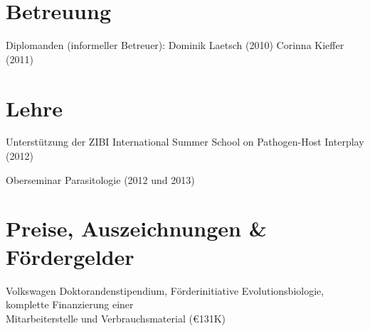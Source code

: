 \documentclass[10pt,a4paper]{article}
\renewenvironment{itemize}{
  \begin{list}{}{
    \setlength{\leftmargin}{2.5em}
    \setlength{\itemsep}{0.25em}
    \setlength{\parskip}{0pt}
    \setlength{\parsep}{0.25em}
  }
}{
  \end{list}
}
\begin{document}
\section*{Betreuung}
\begin{itemize}
\item Diplomanden (informeller Betreuer):\newline
  Dominik Laetsch (2010)\newline
  Corinna Kieffer (2011)
\end{itemize}

\section*{Lehre}
\begin{itemize}
\item Unterst\"utzung der ZIBI International Summer School on Pathogen-Host
  Interplay (2012)
\item Oberseminar Parasitologie (2012 und 2013)
\end{itemize}

\section*{Preise, Auszeichnungen \& F\"ordergelder}

\begin{itemize}
\item [2008] Volkswagen Doktorandenstipendium, F\"orderinitiative
  Evolutionsbiologie, komplette Finanzierung einer \\Mitarbeiterstelle
  und Verbrauchsmaterial (\euro 131K)
\end{itemize}



\end{document}
